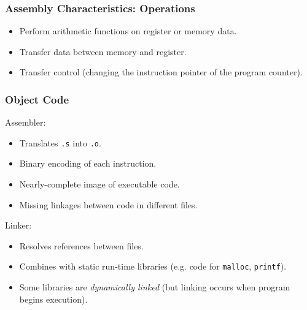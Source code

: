 \documentclass[class=article, crop=false]{standalone}
\begin{document}
  \subsubsection{Assembly Characteristics: Operations}
  \begin{itemize}
    \item Perform arithmetic functions on register or memory data.
    \item Transfer data between memory and register.
    \item Transfer control (changing the instruction pointer of the program counter).
  \end{itemize}
  \subsubsection{Object Code}
  Assembler:
  \begin{itemize}
    \item Translates \texttt{.s} into \texttt{.o}.
    \item Binary encoding of each instruction.
    \item Nearly-complete image of executable code.
    \item Missing linkages between code in different files.
  \end{itemize}
  Linker:
  \begin{itemize}
    \item Resolves references between files.
    \item Combines with static run-time libraries (e.g. code for \texttt{malloc}, \texttt{printf}).
    \item Some libraries are \emph{dynamically linked} (but linking occurs when program begins execution).
  \end{itemize}
\end{document}
